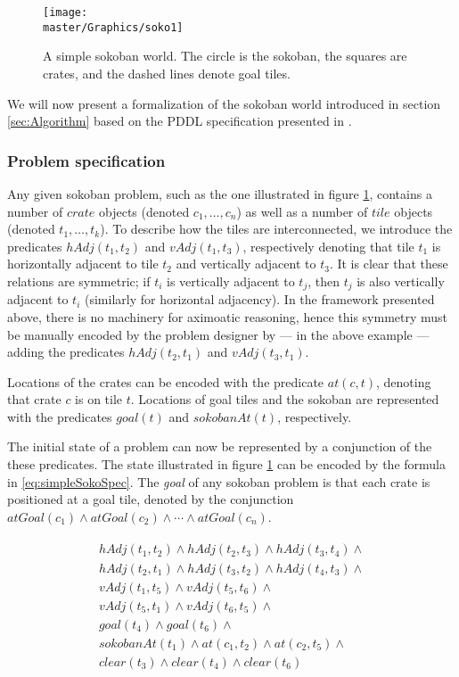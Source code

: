 \documentclass[../Master.tex]{subfiles}
\begin{document}
\begin{figure}
    \centering
    \texttt{[image: \\master/Graphics/soko1]}
    \caption{\label{fig:simpleSokoban} A simple sokoban world. The circle is the sokoban, the squares are crates, and the dashed lines denote goal tiles.}
\end{figure}

We will now present a formalization of the sokoban world introduced in section \ref{sec:Algorithm} based on the PDDL specification presented in \cite{BS2011}.

\subsubsection{Problem specification}
Any given sokoban problem, such as the one illustrated in figure \ref{fig:simpleSokoban}, contains a number of $crate$ objects (denoted $c_1, \dots, c_n$) as well as a number of $tile$ objects (denoted $t_1, \dots, t_k$). To describe how the tiles are interconnected, we introduce the predicates $hAdj(t_1,t_2)$ and $vAdj(t_1,t_3)$, respectively denoting that tile $t_1$ is horizontally adjacent to tile $t_2$ and vertically adjacent to $t_3$. It is clear that these relations are symmetric; if $t_i$ is vertically adjacent to $t_j$, then $t_j$ is also vertically adjacent to $t_i$ (similarly for horizontal adjacency). In the framework presented above, there is no machinery for aximoatic reasoning, hence this symmetry must be manually encoded by the problem designer by --- in the above example --- adding the predicates $hAdj(t_2,t_1)$ and $vAdj(t_3,t_1)$.

Locations of the crates can be encoded with the predicate $at(c, t)$, denoting that crate $c$ is on tile $t$. Locations of goal tiles and the sokoban are represented with the predicates $goal(t)$ and $sokobanAt(t)$, respectively.

The initial state of a problem can now be represented by a conjunction of the these predicates. The state illustrated in figure \ref{fig:simpleSokoban} can be encoded by the formula in \eqref{eq:simpleSokoSpec}. The \textit{goal} of any sokoban problem is that each crate is positioned at a goal tile, denoted by the conjunction $atGoal(c_1) \land atGoal(c_2) \land \cdots \land atGoal(c_n)$.

\begin{gather}
\begin{gathered} \label{eq:simpleSokoSpec}
    hAdj(t_1, t_2) \land hAdj(t_2, t_3) \land hAdj(t_3, t_4) \land \\
    hAdj(t_2, t_1) \land hAdj(t_3, t_2) \land hAdj(t_4, t_3) \land \\
    vAdj(t_1, t_5) \land vAdj(t_5, t_6) \land \\
    vAdj(t_5, t_1) \land vAdj(t_6, t_5) \land \\
    goal(t_4) \land goal(t_6) \land \\
    sokobanAt(t_1) \land at(c_1, t_2) \land at(c_2, t_5) \land \\
    clear(t_3) \land clear(t_4) \land clear(t_6)
\end{gathered}
\end{gather}
\end{document}

